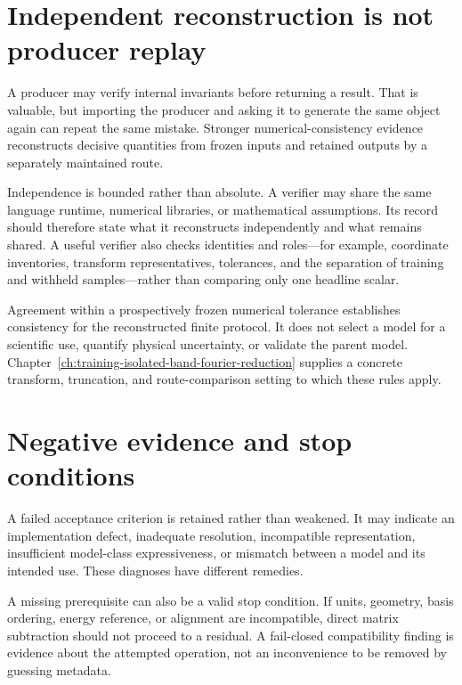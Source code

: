 \section{Independent reconstruction is not producer replay}

A producer may verify internal invariants before returning a result. That is
valuable, but importing the producer and asking it to generate the same object
again can repeat the same mistake. Stronger numerical-consistency evidence
reconstructs decisive quantities from frozen inputs and retained outputs by a
separately maintained route.

Independence is bounded rather than absolute. A verifier may share the same
language runtime, numerical libraries, or mathematical assumptions. Its record
should therefore state what it reconstructs independently and what remains
shared. A useful verifier also checks identities and roles---for example,
coordinate inventories, transform representatives, tolerances, and the
separation of training and withheld samples---rather than comparing only one
headline scalar.

Agreement within a prospectively frozen numerical tolerance establishes
consistency for the reconstructed finite protocol. It does not select a model
for a scientific use, quantify physical uncertainty, or validate the parent
model. Chapter~\ref{ch:training-isolated-band-fourier-reduction} supplies a
concrete transform, truncation, and route-comparison setting to which these
rules apply.

\section{Negative evidence and stop conditions}

A failed acceptance criterion is retained rather than weakened. It may indicate
an implementation defect, inadequate resolution, incompatible representation,
insufficient model-class expressiveness, or mismatch between a model and its
intended use. These diagnoses have different remedies.

A missing prerequisite can also be a valid stop condition. If units, geometry,
basis ordering, energy reference, or alignment are incompatible, direct matrix
subtraction should not proceed to a residual. A fail-closed compatibility
finding is evidence about the attempted operation, not an inconvenience to be
removed by guessing metadata.

